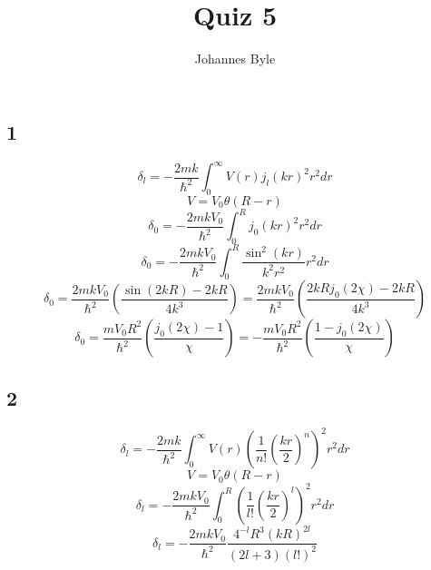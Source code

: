 \documentclass[english]{article}
\begin{document}
\author{Johannes Byle}
\title{Quiz 5}
\maketitle
\subsection*{1}
$$\delta_l=-\frac{2mk}{\hbar^2}\int_0^{\infty}V(r)j_l(kr)^2r^2dr$$
$$V=V_0\theta(R-r)$$
$$\delta_0=-\frac{2mkV_0}{\hbar^2}\int_0^{R}j_0(kr)^2r^2dr$$
$$\delta_0=-\frac{2mkV_0}{\hbar^2}\int_0^{R}\frac{\sin^2(kr)}{k^2r^2}r^2dr$$
$$\delta_0=\frac{2mkV_0}{\hbar^2}\left(\frac{\sin(2kR)-2kR}{4k^3}\right)=\frac{2mkV_0}{\hbar^2}\left(\frac{2kRj_0(2\chi)-2kR}{4k^3}\right)$$
$$\delta_0=\frac{mV_0R^2}{\hbar^2}\left(\frac{j_0(2\chi)-1}{\chi}\right)=-\frac{mV_0R^2}{\hbar^2}\left(\frac{1-j_0(2\chi)}{\chi}\right)$$
\subsection*{2}
$$\delta_l=-\frac{2mk}{\hbar^2}\int_0^{\infty}V(r)\left(\frac{1}{n!}\left(\frac{kr}{2}\right)^n\right)^2 r^2dr$$
$$V=V_0\theta(R-r)$$
$$\delta_l=-\frac{2mkV_0}{\hbar^2}\int_0^{R}\left(\frac{1}{l!}\left(\frac{kr}{2}\right)^l\right)^2 r^2dr$$
$$\delta_l=-\frac{2mkV_0}{\hbar^2}\frac{4^{-l}R^3\left(kR\right)^{2l}}{(2l+3)(l!)^2}$$
\end{document}
